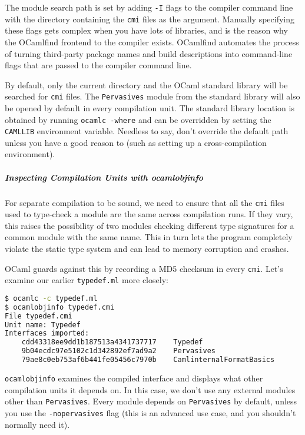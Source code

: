 The module search path is set by adding \passthrough{\lstinline!-I!}
flags to the compiler command line with the directory containing the
\passthrough{\lstinline!cmi!} files as the argument. Manually specifying
these flags gets complex when you have lots of libraries, and is the
reason why the OCamlfind frontend to the compiler exists. OCamlfind
automates the process of turning third-party package names and build
descriptions into command-line flags that are passed to the compiler
command line.

By default, only the current directory and the OCaml standard library
will be searched for \passthrough{\lstinline!cmi!} files. The
\passthrough{\lstinline!Pervasives!} module from the standard library
will also be opened by default in every compilation unit. The standard
library location is obtained by running
\passthrough{\lstinline!ocamlc -where!} and can be overridden by setting
the \passthrough{\lstinline!CAMLLIB!} environment variable. Needless to
say, don't override the default path unless you have a good reason to
(such as setting up a cross-compilation environment).

\hypertarget{inspecting-compilation-units-with-ocamlobjinfo}{%
\subparagraph{Inspecting Compilation Units with
ocamlobjinfo}\label{inspecting-compilation-units-with-ocamlobjinfo}}

For separate compilation to be sound, we need to ensure that all the
\passthrough{\lstinline!cmi!} files used to type-check a module are the
same across compilation runs. If they vary, this raises the possibility
of two modules checking different type signatures for a common module
with the same name. This in turn lets the program completely violate the
static type system and can lead to memory corruption and crashes.

OCaml guards against this by recording a MD5 checksum in every
\passthrough{\lstinline!cmi!}. Let's examine our earlier
\passthrough{\lstinline!typedef.ml!} more closely:

\begin{lstlisting}[language=bash]
$ ocamlc -c typedef.ml
$ ocamlobjinfo typedef.cmi
File typedef.cmi
Unit name: Typedef
Interfaces imported:
    cdd43318ee9dd1b187513a4341737717    Typedef
    9b04ecdc97e5102c1d342892ef7ad9a2    Pervasives
    79ae8c0eb753af6b441fe05456c7970b    CamlinternalFormatBasics
\end{lstlisting}

\passthrough{\lstinline!ocamlobjinfo!} examines the compiled interface
and displays what other compilation units it depends on. In this case,
we don't use any external modules other than
\passthrough{\lstinline!Pervasives!}. Every module depends on
\passthrough{\lstinline!Pervasives!} by default, unless you use the
\passthrough{\lstinline!-nopervasives!} flag (this is an advanced use
case, and you shouldn't normally need it).

